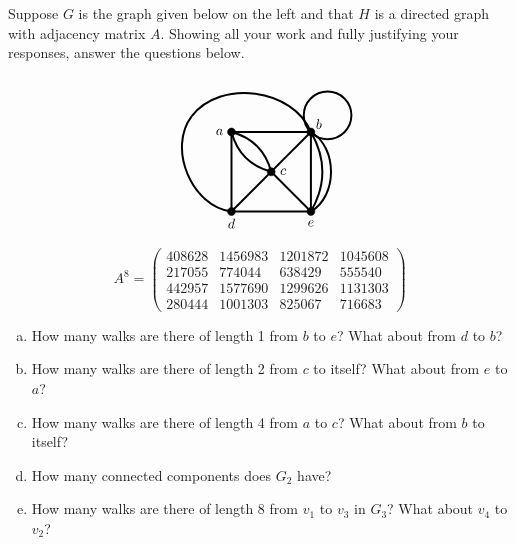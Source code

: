 \documentclass[11pt,letterpaper]{article}
\begin{document}
 Suppose $G$ is the graph given below on the left and that $H$ is a directed graph with adjacency matrix $A$. Showing all your work and fully justifying your responses, answer the questions below. \par
	\begin{minipage}[c]{0.49\textwidth}
	\[
	\begin{tikzpicture}[scale=2]
	\draw[line width=0.05cm] (0,0) to (1,0);
	\draw[line width=0.05cm] (0,0) to (0,1);
	\draw[line width=0.05cm] (0,1) to (1,1);
	\draw[line width=0.05cm] (1,0) to (1,1);
	\draw[line width=0.05cm] (0,0) to (1,1);
	\draw[line width=0.05cm] (0.5,0.5) to (1,0);
	\draw[line width=0.05cm, bend right= 30] (0,1) to (0.5,0.5);
	\draw[line width=0.05cm, bend left= 30] (0,1) to (0.5,0.5);
	\draw[line width=0.05cm, bend right= 30] (1,0) to (1,1);
	\draw[line width=0.05cm, bend right= 60] (1,0) to (1,1);
	\draw[line width=0.05cm, bend left= 60] (0,0) to (-0.5,1.2);
	\draw[line width=0.05cm, bend right= 60] (1,1) to (-0.5,1.2);
	\draw[line width=0.05cm] (1.21,1.21) circle (0.3);
	
	\draw[fill= black] (0,0) circle (0.05);
	\draw[fill= black] (1,0) circle (0.05);
	\draw[fill= black] (1,1) circle (0.05);
	\draw[fill= black] (0,1) circle (0.05);
	\draw[fill= black] (0.5,0.5) circle (0.05);
	
	\node at (-0.15,1) {$a$};
	\node at (1.10,1.10) {$b$};
	\node at (0.65,0.50) {$c$};
	\node at (0,-0.15) {$d$};
	\node at (1,-0.15) {$e$};
	\end{tikzpicture}
	\]
	\end{minipage}%
	\begin{minipage}[c]{0.49\textwidth}
	\[
	A^8= 
	\begin{pmatrix}
	408 628 & 1456983 & 1201872 & 1045608 \\
	217055 & 774044 & 638429 & 555540 \\
	442957 & 1577690 & 1299626 & 1131303 \\
	280444 & 1001303 & 825067 & 716683
	\end{pmatrix}
	\]
	\end{minipage}

\begin{enumerate}[(a)]
\item How many walks are there of length 1 from $b$ to $e$? What about from $d$ to $b$?
\item How many walks are there of length 2 from $c$ to itself? What about from $e$ to $a$?
\item How many walks are there of length 4 from $a$ to $c$? What about from $b$ to itself?
\item How many connected components does $G_2$ have?
\item How many walks are there of length 8 from $v_1$ to $v_3$ in $G_3$? What about $v_4$ to $v_2$?
\end{enumerate}
\end{document}
